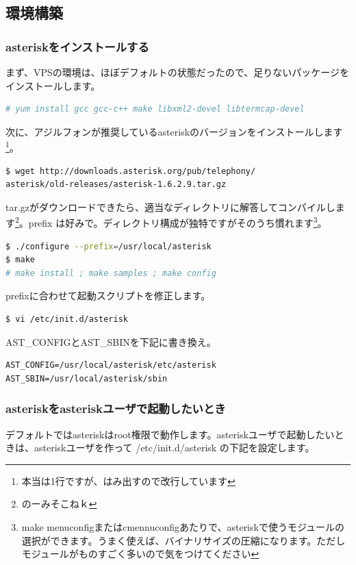 \subsection{環境構築}
\subsubsection{asteriskをインストールする}

まず、VPSの環境は、ほぼデフォルトの状態だったので、足りないパッケージをインストールします。

\begin{lstlisting}[language=bash]
# yum install gcc gcc-c++ make libxml2-devel libtermcap-devel
\end{lstlisting}

次に、アジルフォンが推奨しているasteriskのバージョンをインストールします\footnote{本当は1行ですが、はみ出すので改行しています}。

\begin{lstlisting}[language=bash]
$ wget http://downloads.asterisk.org/pub/telephony/
asterisk/old-releases/asterisk-1.6.2.9.tar.gz
\end{lstlisting}

tar.gzがダウンロードできたら、適当なディレクトリに解答してコンパイルします\footnote{のーみそこねｋ}。prefix は好みで。ディレクトリ構成が独特ですがそのうち慣れます\footnote{make menuconfigまたはcmennuconfigあたりで、asteriskで使うモジュールの選択ができます。うまく使えば、バイナリサイズの圧縮になります。ただしモジュールがものすごく多いので気をつけてください}。

\begin{lstlisting}[language=bash]
$ ./configure --prefix=/usr/local/asterisk
$ make
# make install ; make samples ; make config
\end{lstlisting}

prefixに合わせて起動スクリプトを修正します。

\begin{lstlisting}[language=bash]
$ vi /etc/init.d/asterisk
\end{lstlisting}

AST\_CONFIGとAST\_SBINを下記に書き換え。

\begin{lstlisting}
AST_CONFIG=/usr/local/asterisk/etc/asterisk
AST_SBIN=/usr/local/asterisk/sbin
\end{lstlisting}

\subsubsection{asteriskをasteriskユーザで起動したいとき}
デフォルトではasteriskはroot権限で動作します。asteriskユーザで起動したいときは、asteriskユーザを作って /etc/init.d/asterisk の下記を設定します。


